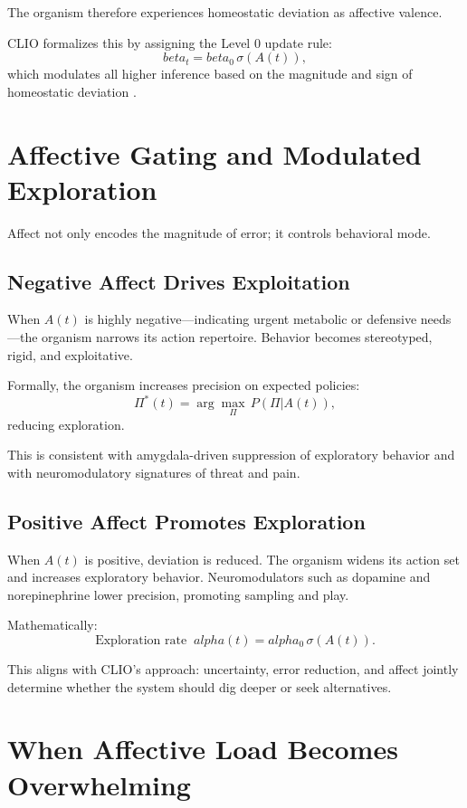 \documentclass[12pt,oneside]{book}
\theoremstyle{plain}
\theoremstyle{definition}
\let\citep\parencite
\def\mathbb#1{#1}%
\def\alpha{alpha}%
\def\beta{beta}%
\begin{document}
The organism therefore experiences homeostatic deviation as affective
valence.

CLIO formalizes this by assigning the Level 0 update rule:
\[
\beta_t = \beta_0 \, \sigma(A(t)),
\]
which modulates all higher inference based on the magnitude and sign of
homeostatic deviation \citep{cheng2025cognitive}.

\section{Affective Gating and Modulated Exploration}

Affect not only encodes the magnitude of error; it controls behavioral mode.

\subsection{Negative Affect Drives Exploitation}

When $A(t)$ is highly negative—indicating urgent metabolic or defensive
needs—the organism narrows its action repertoire.
Behavior becomes stereotyped, rigid, and exploitative.

Formally, the organism increases precision on expected policies:
\[
\Pi^*(t) = \arg\max_{\Pi} \, \mathbb{P}(\Pi|A(t)),
\]
reducing exploration.

This is consistent with amygdala-driven suppression of exploratory behavior
and with neuromodulatory signatures of threat and pain.

\subsection{Positive Affect Promotes Exploration}

When $A(t)$ is positive, deviation is reduced.
The organism widens its action set and increases exploratory behavior.
Neuromodulators such as dopamine and norepinephrine lower precision,
promoting sampling and play.

Mathematically:
\[
\text{Exploration rate} \;\;\alpha(t)
= \alpha_0 \, \sigma\!\left( A(t) \right).
\]

This aligns with CLIO’s approach:
uncertainty, error reduction, and affect jointly determine whether the system
should dig deeper or seek alternatives.

\section{When Affective Load Becomes Overwhelming}
\end{document}
